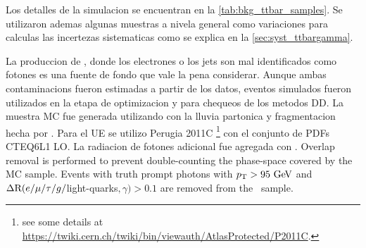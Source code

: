 Los detalles de la simulacion se encuentran en la \cref{tab:bkg_ttbar_samples}.
Se utilizaron ademas algunas muestras a nivela general como variaciones para calculas
las incertezas sistematicas como se explica en la \cref{sec:syst_ttbargamma}.




La produccion de {\ttbar}, donde los electrones o los jets
son mal identificados como fotones es una fuente de fondo que
vale la pena considerar.
Aunque ambas contaminacions fueron estimadas a partir de los datos, eventos simulados fueron
utilizados en la etapa de optimizacion y para chequeos de los metodos DD. La
muestra MC fue generada utilizando {\powheg}\cite{Nason:2004rx,Frixione:2007vw,Alioli:2010xd}
con la lluvia partonica y fragmentacion hecha por {\pythia}.
Para el UE se utilizo Perugia 2011C \footnote{see some details at \url{https://twiki.cern.ch/twiki/bin/viewauth/AtlasProtected/P2011C}.}
con el conjunto de PDFs CTEQ6L1 LO.
La radiacion de fotones adicional fue agregada con {\photos} \cite{photos}.
Overlap removal is performed to prevent double-counting the phase-space
covered by the {\ttgam} MC sample. Events with truth prompt photons with
$\pt > 95 \gev$ and $\Delta{\rm R}(e/\mu/\tau/g/$light-quarks$, \gamma) > 0.1$ are removed from the \ttbar\ sample.


